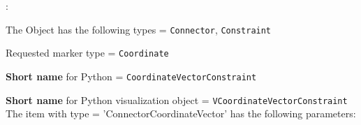 \noindent {}:
\bi
  \item The Object has the following types = \texttt{Connector}, \texttt{Constraint}
  \item Requested marker type = \texttt{Coordinate}
  \item {\bf Short name} for Python = \texttt{CoordinateVectorConstraint}
  \item {\bf Short name} for Python visualization object = \texttt{VCoordinateVectorConstraint}
\ei\vspace{12pt} \noindent 
The item  with type = 'ConnectorCoordinateVector' has the following parameters:
\vspace{-0.5cm}\\
\vspace{-0.5cm}\\

